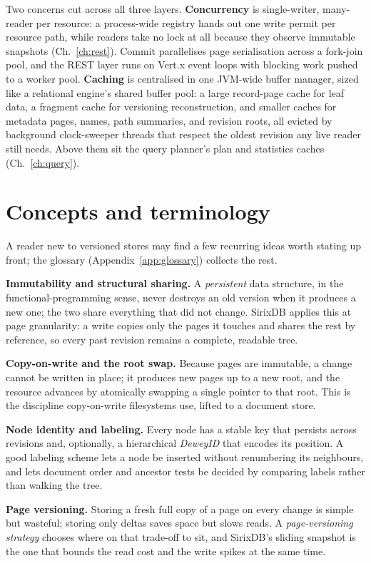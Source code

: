 \documentclass[11pt,a4paper,oneside]{report}
\theoremstyle{sirixthm}
\begin{document}
Two concerns cut across all three layers. \textbf{Concurrency} is single-writer, many-reader per
resource: a process-wide registry hands out one write permit per resource path, while readers take no
lock at all because they observe immutable snapshots (Ch.~\ref{ch:rest}). Commit parallelises page
serialisation across a fork-join pool, and the REST layer runs on Vert.x event loops with blocking work
pushed to a worker pool. \textbf{Caching} is centralised in one JVM-wide buffer manager, sized like a
relational engine's shared buffer pool: a large record-page cache for leaf data, a fragment cache for
versioning reconstruction, and smaller caches for metadata pages, names, path summaries, and revision
roots, all evicted by background clock-sweeper threads that respect the oldest revision any live reader
still needs. Above them sit the query planner's plan and statistics caches (Ch.~\ref{ch:query}).

\section{Concepts and terminology}

A reader new to versioned stores may find a few recurring ideas worth stating up front; the glossary
(Appendix~\ref{app:glossary}) collects the rest.

\textbf{Immutability and structural sharing.} A \emph{persistent} data structure, in the
functional-programming sense, never destroys an old version when it produces a new one; the two share
everything that did not change. SirixDB applies this at page granularity: a write copies only the pages
it touches and shares the rest by reference, so every past revision remains a complete, readable tree.

\textbf{Copy-on-write and the root swap.} Because pages are immutable, a change cannot be written in
place; it produces new pages up to a new root, and the resource advances by atomically swapping a single
pointer to that root. This is the discipline copy-on-write filesystems use, lifted to a document store.

\textbf{Node identity and labeling.} Every node has a stable key that persists across revisions and,
optionally, a hierarchical \emph{DeweyID} that encodes its position. A good labeling scheme lets a node
be inserted without renumbering its neighbours, and lets document order and ancestor tests be decided by
comparing labels rather than walking the tree.

\textbf{Page versioning.} Storing a fresh full copy of a page on every change is simple but wasteful;
storing only deltas saves space but slows reads. A \emph{page-versioning strategy} chooses where on that
trade-off to sit, and SirixDB's sliding snapshot is the one that bounds the read cost and the write
spikes at the same time.
\end{document}
